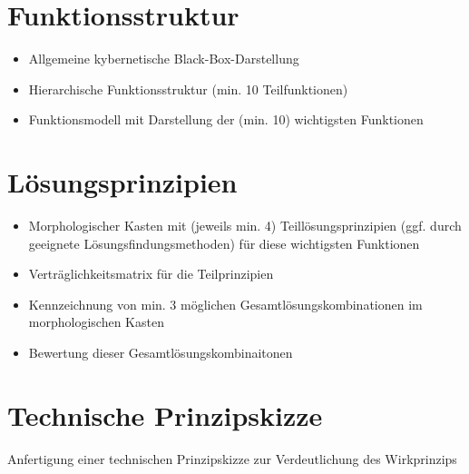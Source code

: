 \section{Funktionsstruktur}

\begin{itemize}
	\item Allgemeine kybernetische Black-Box-Darstellung
	\item Hierarchische Funktionsstruktur (min. 10 Teilfunktionen)
	\item Funktionsmodell mit Darstellung der (min. 10) wichtigsten Funktionen
\end{itemize}


\section{Lösungsprinzipien}

\begin{itemize}
	\item Morphologischer Kasten mit (jeweils min. 4) Teillösungsprinzipien (ggf. durch geeignete Lösungsfindungsmethoden) für diese wichtigsten Funktionen
	\item Verträglichkeitsmatrix für die Teilprinzipien
	\item Kennzeichnung von min. 3 möglichen Gesamtlösungskombinationen im morphologischen Kasten
	\item Bewertung dieser Gesamtlösungskombinaitonen
\end{itemize}

\section{Technische Prinzipskizze}

Anfertigung einer technischen Prinzipskizze zur Verdeutlichung des Wirkprinzips